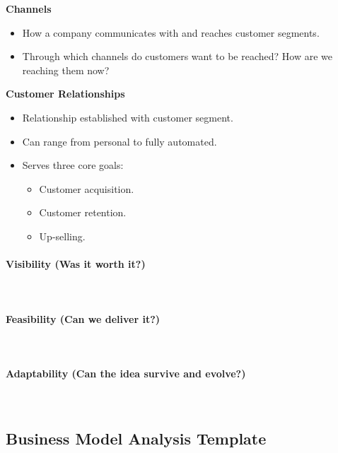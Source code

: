 \medskip

\textbf{Channels}
\begin{itemize}
    \item How a company communicates with and reaches customer segments.
    \item Through which channels do customers want to be reached? How are we reaching
    them now?
\end{itemize}

\medskip

\textbf{Customer Relationships}
\begin{itemize}
    \item Relationship established with customer segment.
    \item Can range from personal to fully automated.
    \item Serves three core goals:
    \begin{itemize}
        \item Customer acquisition.
        \item Customer retention.
        \item Up-selling.
    \end{itemize}
\end{itemize}

\paragraph{Visibility (Was it worth it?)}\mbox{}\\[4pt]

\paragraph{Feasibility (Can we deliver it?)}\mbox{}\\[4pt]

\paragraph{Adaptability (Can the idea survive and evolve?)}\mbox{}\\[4pt]

\subsection{Business Model Analysis Template}

